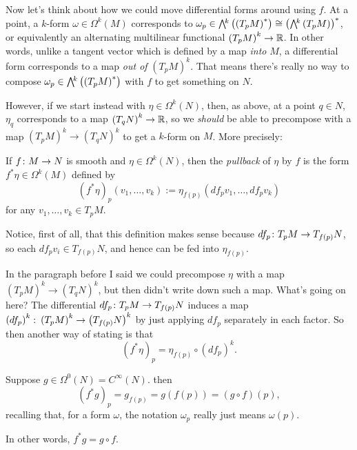Now let's think about how we could move differential forms around using $f$. At a point, a $k$-form $\omega \in \Omega^k(M)$ corresponds to $\omega_p \in \ext{k}\left(\left(T_pM\right)^\ast\right) \cong \left(\ext{k}\left(T_pM\right)\right)^\ast$, or equivalently an alternating multilinear functional $\left(T_pM\right)^k \to \mathbb{R}$. In other words, unlike a tangent vector which is defined by a map \emph{into} $M$, a differential form corresponds to a map \emph{out of} $\left(T_pM\right)^k$. That means there's really no way to compose $\omega_p \in \ext{k}\left(\left(T_pM\right)^\ast\right)$ with $f$ to get something on $N$.

However, if we start instead with $\eta \in \Omega^k(N)$, then, as above, at a point $q \in N$, $\eta_q$ corresponds to a map $\left(T_qN\right)^k \to \mathbb{R}$, so we \emph{should} be able to precompose with a map $\left(T_pM\right)^k \to \left(T_q N \right)^k$ to get a $k$-form on $M$. More precisely:

\begin{definition}\label{def:pullback}
	If $f \colon\thinspace\! M \to N$ is smooth and $\eta \in \Omega^k(N)$, then the \emph{pullback} of $\eta$ by $f$ is the form $f^\ast \eta \in \Omega^k(M)$ defined by
	\[
		(f^\ast \eta)_p(v_1, \dots , v_k) := \eta_{f(p)}(df_p v_1, \dots, df_pv_k)
	\]
	for any $v_1, \dots , v_k \in T_pM$.
\end{definition}

Notice, first of all, that this definition makes sense because $df_p\colon\thinspace\! T_pM \to T_{f(p)}N$, so each $df_p v_i \in T_{f(p)}N$, and hence can be fed into $\eta_{f(p)}$. 

In the paragraph before  I said we could precompose $\eta$ with a map $\left(T_pM\right)^k \to \left(T_q N \right)^k$, but then didn't write down such a map. What's going on here? The differential $df_p \colon\thinspace\! T_p M \to T_{f(p)}N$ induces a map $\left(df_p\right)^k \colon\thinspace\! \left(T_p M\right)^k \to \left(T_{f(p)}N\right)^k$ by just applying $df_p$ separately in each factor. So then another way of stating  is that 
\[ 
	(f^\ast \eta)_p = \eta_{f(p)} \circ (df_p)^k.
\]

\begin{example}\label{ex:pullbacks of functions are compositions}
	Suppose $g \in \Omega^0(N) = C^\infty(N)$. then 
	\[
		(f^\ast g)_p = g_{f(p)} = g(f(p)) = (g \circ f)(p),
	\]
	recalling that, for a form $\omega$, the notation $\omega_p$ really just means $\omega(p)$.
	
	In other words, $f^\ast g = g \circ f$.
\end{example}

